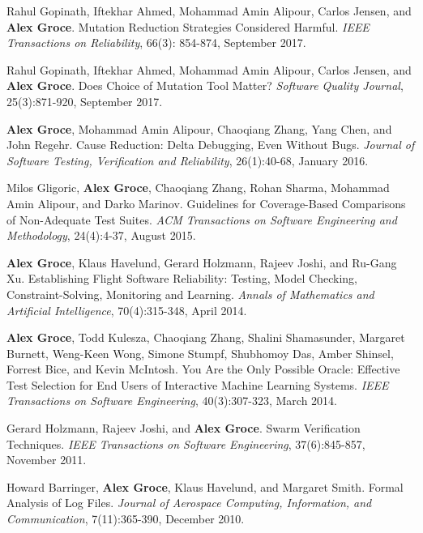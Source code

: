 \documentclass[ComputerScience]{vita}
\begin{document}
\begin{vita}
\begin{Refereed Journal Publications}
\item
Rahul Gopinath, Iftekhar Ahmed, Mohammad Amin Alipour, Carlos Jensen, and {\bf Alex Groce}.
\newblock Mutation Reduction Strategies Considered Harmful.
\newblock \emph{IEEE Transactions on Reliability}, 66(3): 854-874, September 2017.


\item
Rahul Gopinath, Iftekhar Ahmed, Mohammad Amin Alipour, Carlos Jensen, and {\bf Alex Groce}.
\newblock Does Choice of Mutation Tool Matter?
\newblock \emph{Software Quality Journal}, 25(3):871-920, September 2017.

\item
{\bf Alex Groce}, Mohammad Amin Alipour, Chaoqiang Zhang, Yang Chen, and John Regehr.
\newblock Cause Reduction: Delta Debugging, Even Without Bugs.
\newblock \emph{Journal of Software Testing, Verification and Reliability}, 26(1):40-68, January 2016.

\item
Milos Gligoric, {\bf Alex Groce}, Chaoqiang Zhang, Rohan Sharma, Mohammad Amin Alipour, and Darko Marinov.
\newblock Guidelines for Coverage-Based Comparisons of Non-Adequate Test Suites.
\newblock \emph{ACM Transactions on Software Engineering and Methodology}, 24(4):4-37, August 2015.

\item
{\bf Alex Groce}, Klaus Havelund, Gerard Holzmann, Rajeev Joshi, and Ru-Gang Xu.
\newblock Establishing Flight Software Reliability: Testing, Model Checking, Constraint-Solving, Monitoring and Learning.
\newblock \emph{Annals of Mathematics and Artificial Intelligence}, 70(4):315-348, April 2014.

\item
{\bf Alex Groce}, Todd Kulesza, Chaoqiang Zhang, Shalini Shamasunder, Margaret Burnett, Weng-Keen Wong, Simone Stumpf, Shubhomoy Das, Amber Shinsel, Forrest Bice, and Kevin McIntosh.
\newblock You Are the Only Possible Oracle: Effective Test Selection for End Users of Interactive Machine Learning Systems.
\newblock \emph{IEEE Transactions on Software Engineering}, 40(3):307-323, March 2014.

\item 
Gerard Holzmann, Rajeev Joshi, and {\bf Alex Groce}.
\newblock Swarm Verification Techniques.
\newblock \emph{IEEE Transactions on Software Engineering}, 37(6):845-857, November 2011.

\item
Howard Barringer, {\bf Alex Groce}, Klaus Havelund, and Margaret Smith.
\newblock Formal Analysis of Log Files.
\newblock \emph{Journal of Aerospace Computing, Information, and Communication}, 7(11):365-390, December 2010.


\end{Refereed Journal Publications}
\end{vita}
\end{document}
